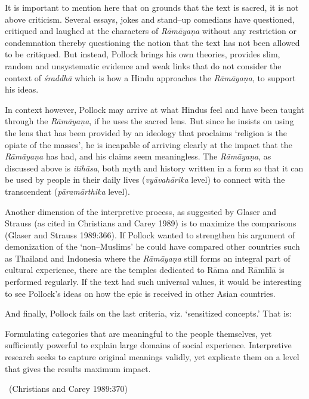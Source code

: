 It is important to mention here that on grounds that the text is sacred, it is not above criticism. Several essays, jokes and stand–up comedians have questioned, critiqued and laughed at the characters of \textit{Rāmāyaṇa} without any restriction or condemnation thereby questioning the notion that the text has not been allowed to be critiqued. But instead, Pollock brings his own theories, provides slim, random and unsystematic evidence and weak links that do not consider the context of \textit{śraddhā} which is how a Hindu approaches the \textit{Rāmāyaṇa}, to support his ideas.

In context however, Pollock may arrive at what Hindus feel and have been taught through the \textit{Rāmāyaṇa}, if he uses the sacred lens. But since he insists on using the lens that has been provided by an ideology that proclaims ‘religion is the opiate of the masses’, he is incapable of arriving clearly at the impact that the \textit{Rāmāyaṇa} has had, and his claims seem meaningless. The \textit{Rāmāyaṇa}, as discussed above is \textit{itihāsa}, both myth and history written in a form so that it can be used by people in their daily lives (\textit{vyāvahārika} level) to connect with the transcendent (\textit{pāramārthika} level).

Another dimension of the interpretive process, as suggested by Glaser and Strauss (as cited in Christians and Carey 1989) is to maximize the comparisons (Glaser and Strauss 1989:366). If Pollock wanted to strengthen his argument of demonization of the ‘non–Muslims’ he could have compared other countries such as Thailand and Indonesia where the \textit{Rāmāyaṇa} still forms an integral part of cultural experience, there are the temples dedicated to Rāma and Rāmlīlā is performed regularly. If the text had such universal values, it would be interesting to see Pollock’s ideas on how the epic is received in other Asian countries.

And finally, Pollock fails on the last criteria, viz. ‘sensitized concepts.’ That is:

\begin{myquote}
Formulating categories that are meaningful to the people themselves, yet sufficiently powerful to explain large domains of social experience. Interpretive research seeks to capture original meanings validly, yet explicate them on a level that gives the results maximum impact. 

~\hfill (Christians and Carey 1989:370)
\end{myquote}


